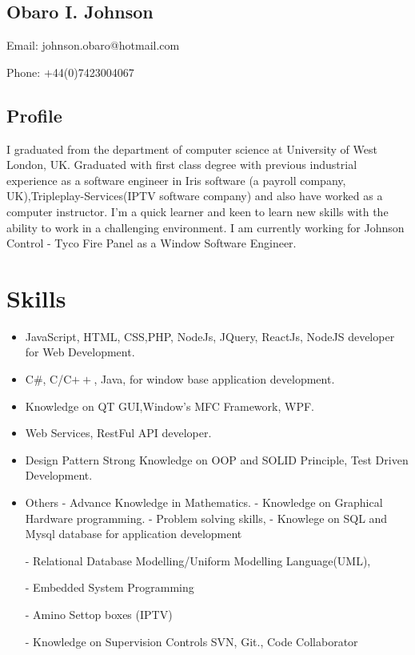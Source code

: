 \documentclass[11px]{article}
\begin{document}
	\begin{center}
	\section*{Obaro I. Johnson}
	Email: johnson.obaro@hotmail.com
	
    Phone: $+$44(0)7423004067
    \end{center}
   \makebox[\linewidth]{\rule{\paperwidth}{0.1pt}}
	
	\subsection*{Profile}
	I graduated from the department of computer science at University of West London, UK. Graduated with first class degree with previous industrial experience as a software engineer in   Iris software  (a payroll company, UK),Tripleplay-Services(IPTV software company) and also have worked as a computer instructor. I'm a quick learner and keen to learn new skills with the ability to work in a challenging environment.  I am currently working for Johnson Control - Tyco Fire Panel as a Window Software Engineer.
	
\section*{Skills}
 \begin{itemize}
 	\item JavaScript, HTML, CSS,PHP, NodeJs, JQuery, ReactJs, NodeJS developer for Web Development.
 	 
 	\item  C\#,  C/C$++$, Java, for window base application development.
 	\item Knowledge on QT GUI,Window's MFC Framework, WPF.
 	
 	\item Web Services, RestFul API developer.
 	   
 	\item Design Pattern
 	     Strong Knowledge on OOP and SOLID Principle, 	     
 	     Test Driven Development.
 	\item Others 	
 	  - Advance Knowledge in Mathematics. 	  
 	  - Knowledge on Graphical Hardware programming. 	  
 	  - Problem solving skills, 	  
 	  - Knowlege on SQL and Mysql database for application development
 	  
 	  - Relational Database Modelling/Uniform Modelling Language(UML),
 	 
 	  - Embedded System Programming 
 	 
	 	 -  Amino Settop boxes (IPTV)
	 	 
	 	 - Knowledge on Supervision Controls SVN, Git., Code Collaborator
 	 	  
 \end{itemize}
 \hrulefill
 
\end{document}
